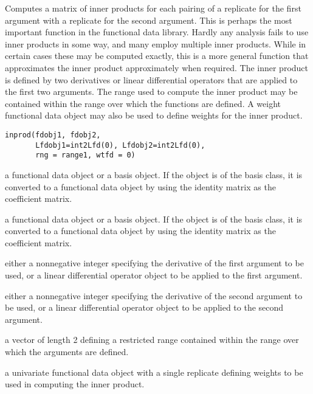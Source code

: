 \begin{Description}\relax
Computes a matrix of inner products for each pairing of a
replicate for the first argument with a replicate for the
second argument.  This is perhaps the most important function
in the functional data library.  Hardly any analysis fails
to use inner products in some way, and many employ multiple
inner products.  While in certain cases
these may be computed exactly, this is a more general function that
approximates the inner product approximately when required.
The inner product is defined by two derivatives or linear
differential operators that are applied to the
first two arguments.  The range used to compute the inner
product may be contained within the range over which the
functions are defined.  A weight functional data object may
also be used to define weights for the inner product.
\end{Description}
\begin{Usage}
\begin{verbatim}
inprod(fdobj1, fdobj2,
       Lfdobj1=int2Lfd(0), Lfdobj2=int2Lfd(0),
       rng = range1, wtfd = 0)
\end{verbatim}
\end{Usage}
\begin{Arguments}
\begin{ldescription}
\item[\code{fdobj1}] a functional data object or a basis object.  If the object is
of the basis class, it is converted to a functional data object
by using the identity matrix as the coefficient matrix.

\item[\code{fdobj2}] a functional data object or a basis object.  If the object is
of the basis class, it is converted to a functional data object
by using the identity matrix as the coefficient matrix.

\item[\code{Lfdobj1}] either a nonnegative integer specifying the derivative of
the first argument to be used, or a linear differential operator
object to be applied to the first argument.

\item[\code{Lfdobj2}] either a nonnegative integer specifying the derivative of
the second argument to be used, or a linear differential operator
object to be applied to the second argument.

\item[\code{rng}] a vector of length 2 defining a restricted range contained
within the range over which the arguments are defined.

\item[\code{wtfd}] a univariate functional data object with a single replicate
defining weights to be used in computing the inner product.

\end{ldescription}
\end{Arguments}
